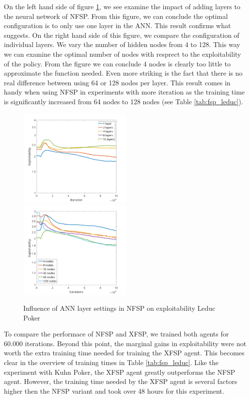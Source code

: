 \documentclass[10pt,a4paper]{article}
\begin{document}
On the left hand side of figure \ref{fig:layers_leduc}, we see examine the impact of adding layers to the neural network of NFSP. From this figure, we can conclude the optimal configuration is to only use one layer in the ANN. This result confirms what \citeauthor{heinrichphd} \cite{heinrichphd} suggests.
On the right hand side of this figure, we compare the configuration of individual layers. We vary the number of hidden nodes from 4 to 128. This way we can examine the optimal number of nodes with resprect to the exploitability of the policy.
From the figure we can conclude 4 nodes is clearly too little to approximate the function needed. Even more striking is the fact that there is no real difference between using 64 or 128 nodes per layer. This result comes in handy when using NFSP in experiments with more iteration as the training time is significantly increased from 64 nodes to 128 nodes (see Table \ref{tab:fsp_leduc}).
\begin{center}
\begin{figure}[h]
\label{fig:layers_leduc}
\includegraphics[width=0.5\textwidth]{Figures/leduc_layers.png}
\includegraphics[width=0.5\textwidth]{Figures/leduc_nodes.png}
\caption{Influence of ANN layer settings in NFSP on exploitability Leduc Poker}
\end{figure}
\end{center}
To compare the performace of NFSP and XFSP, we trained both agents for 60.000 iterations. Beyond this point, the marginal gains in exploitability were not worth the extra training time needed for training the XFSP agent. This becomes clear in the overview of training times in Table \ref{tab:fsp_leduc}. Like the experiment with Kuhn Poker, the XFSP agent greatly outperforms the NFSP agent. However, the training time needed by the XFSP agent is several factors higher then the NFSP variant and took over 48 hours for this experiment.
\end{document}

